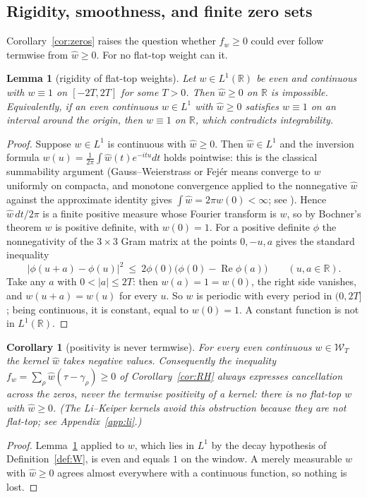 \documentclass[11pt]{amsart}
\newtheorem{lemma}[theorem]{Lemma}
\newtheorem{corollary}[theorem]{Corollary}
\theoremstyle{definition}
\theoremstyle{remark}
\newcommand{\R}{\mathbb R}
\newcommand{\Rel}{\operatorname{Re}}
\newcommand{\wh}{\widehat w}
\newcommand{\Wcl}{\mathcal W_T}
\begin{document}
\subsection{Rigidity, smoothness, and finite zero sets}

Corollary~\ref{cor:zeros} raises the question whether $f_w\ge0$ could ever follow termwise from
$\wh\ge0$. For no flat-top weight can it.

\begin{lemma}[rigidity of flat-top weights]\label{lem:Rrig}
Let $w\in L^1(\R)$ be even and continuous with $w\equiv1$ on $[-2T,2T]$ for some $T>0$. Then
$\wh\ge0$ on $\R$ is impossible. Equivalently, if an even continuous $w\in L^1$ with $\wh\ge0$
satisfies $w\equiv1$ on an interval around the origin, then $w\equiv1$ on $\R$, which contradicts
integrability.
\end{lemma}
\begin{proof}
Suppose $w\in L^1$ is continuous with $\wh\ge0$. Then $\wh\in L^1$ and the inversion formula
$w(u)=\frac1{2\pi}\int\wh(t)e^{-itu}dt$ holds pointwise: this is the classical summability argument
(Gauss--Weierstrass or Fej\'er means converge to $w$ uniformly on compacta, and monotone convergence
applied to the nonnegative $\wh$ against the approximate identity gives $\int\wh=2\pi w(0)<\infty$;
see \cite[Ch.~VI]{Katznelson}). Hence $\wh\,dt/2\pi$ is a finite positive measure whose Fourier
transform is $w$, so by Bochner's theorem $w$ is positive definite, with $w(0)=1$. For a positive
definite $\phi$ the nonnegativity of the $3\times3$ Gram matrix at the points $0,-u,a$ gives the
standard inequality
\[
|\phi(u+a)-\phi(u)|^2\ \le\ 2\phi(0)\big(\phi(0)-\Rel\phi(a)\big)\qquad(u,a\in\R).
\]
Take any $a$ with $0<|a|\le2T$: then $w(a)=1=w(0)$, the right side vanishes, and $w(u+a)=w(u)$ for
every $u$. So $w$ is periodic with every period in $(0,2T]$; being continuous, it is constant, equal
to $w(0)=1$. A constant function is not in $L^1(\R)$.
\end{proof}

\begin{corollary}[positivity is never termwise]\label{cor:nontermwise}
For every even continuous $w\in\Wcl$ the kernel $\wh$ takes negative values. Consequently the
inequality $f_w=\sum_\rho\wh(\tau-\gamma_\rho)\ge0$ of Corollary~\ref{cor:RH} always expresses
cancellation across the zeros, never the termwise positivity of a kernel: there is no flat-top $w$
with $\wh\ge0$. \textup{(}The Li--Keiper kernels avoid this obstruction because they are not
flat-top; see Appendix~\ref{app:li}.\textup{)}
\end{corollary}
\begin{proof}
Lemma~\ref{lem:Rrig} applied to $w$, which lies in $L^1$ by the decay hypothesis of
Definition~\ref{def:W}, is even and equals $1$ on the window. A merely measurable $w$ with $\wh\ge0$
agrees almost everywhere with a continuous function, so nothing is lost.
\end{proof}
\end{document}
